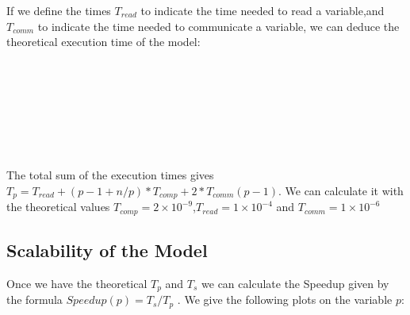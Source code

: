 \documentclass[11pt]{scrartcl} %
\begin{document}
If we define the times $T_{read}$ to indicate the time needed to read a variable,and $T_{comm}$ to indicate the time needed to communicate a variable, we can deduce the theoretical execution time of the model:
\  
\begin{algorithmic}
\end{algorithmic}
\ 
\begin{algorithmic}
\end{algorithmic}
\ 

\begin{algorithmic}

  \ENDFOR
{}
\end{algorithmic}

\ 
\begin{algorithmic}
\end{algorithmic}
\ 
\begin{algorithmic}
		\FOR{i from $1$ to p}  \ENDFOR
\end{algorithmic}

The total sum of the execution times gives $T_p = T_{read} + (p-1+n/p)*T_{comp}+2*T_{comm}(p-1)$. We can calculate it with the theoretical values $T_{comp} =2 \times 10^{-9}$,$T_{read}= 1 \times 10^{-4}$ and $T_{comm}= 1 \times 10^{-6}$

\subsection{Scalability of the Model}

Once we have the theoretical $T_p$ and $T_s$ we can calculate the Speedup given by the formula $Speedup(p)=T_s/T_p$ . We give the following plots on the variable $p$:

\end{document}
